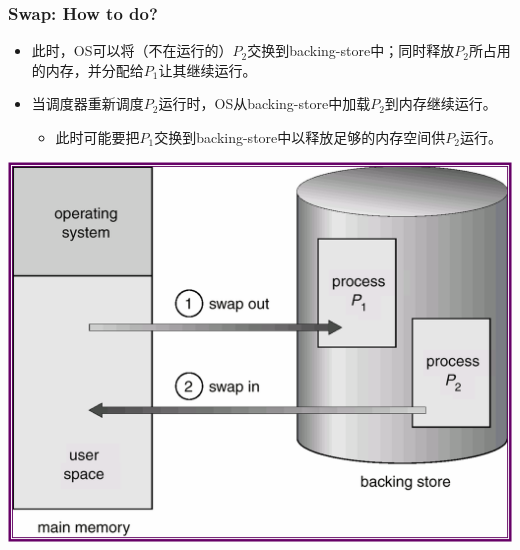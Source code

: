 \documentclass[CJKutf8,xcolor=pdftex,dvipsnames,table]{beamer}
\begin{document}
\begin{CJK*}{UTF8}{song}
  \begin{frame}
  \frametitle{Swap: How to do?} \pause
  \begin{itemize}
  \item{此时，OS可以将（不在运行的）$P_2$交换到backing-store中；同时释放$P_2$所占用的内存，并分配给$P_1$让其继续运行。} \pause
  \item{当调度器重新调度$P_2$运行时，OS从backing-store中加载$P_2$到内存继续运行。} \pause
    \begin{itemize}
    \item{此时可能要把$P_1$交换到backing-store中以释放足够的内存空间供$P_2$运行。} \pause
    \end{itemize}
  \end{itemize}
  \begin{center}
    \includegraphics[scale=.3]{v6f9-4}
  \end{center}
  \end{frame}
  

\end{CJK*}
\end{document}
